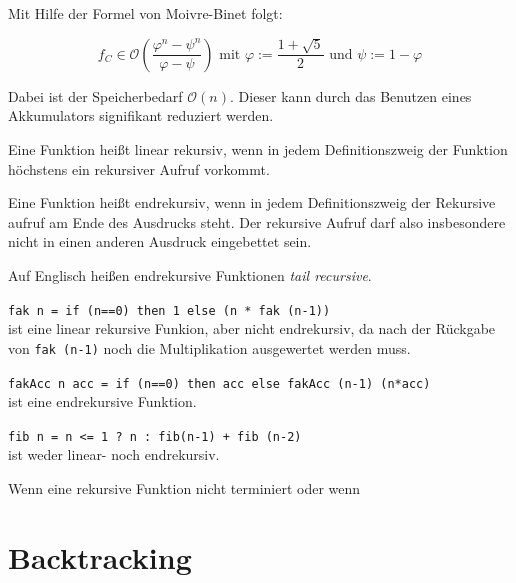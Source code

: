 Mit Hilfe der Formel von Moivre-Binet folgt:

\[f_C \in \mathcal{O} \left (\frac{\varphi^n- \psi^n}{\varphi - \psi} \right) \text{ mit } \varphi := \frac{1+ \sqrt{5}}{2} \text{ und }\psi := 1 - \varphi\]

Dabei ist der Speicherbedarf $\mathcal{O}(n)$. Dieser kann durch
das Benutzen eines Akkumulators signifikant reduziert werden.

\begin{definition}%
    Eine Funktion heißt linear rekursiv, wenn in jedem Definitionszweig
    der Funktion höchstens ein rekursiver Aufruf vorkommt.
\end{definition}

\begin{definition}%
    Eine Funktion heißt endrekursiv, wenn in jedem Definitionszweig
    der Rekursive aufruf am Ende des Ausdrucks steht. Der rekursive
    Aufruf darf also insbesondere nicht in einen anderen Ausdruck
    eingebettet sein.
\end{definition}

Auf Englisch heißen endrekursive Funktionen \textit{tail recursive}.

\begin{beispiel}
    \begin{bspenum}
        \item \texttt{fak n = if (n==0) then 1 else (n * fak (n-1))}\\
              ist eine linear rekursive Funkion, aber nicht endrekursiv,
              da nach der Rückgabe von \texttt{fak (n-1)} noch die Multiplikation
              ausgewertet werden muss.
        \item \texttt{fakAcc n acc = if (n==0) then acc else fakAcc (n-1) (n*acc)}\\
              ist eine endrekursive Funktion.
        \item \texttt{fib n = n <= 1 ? n : fib(n-1) + fib (n-2)}\\
              ist weder linear- noch endrekursiv.
    \end{bspenum}
\end{beispiel}

Wenn eine rekursive Funktion nicht terminiert oder wenn 

\section{Backtracking}

